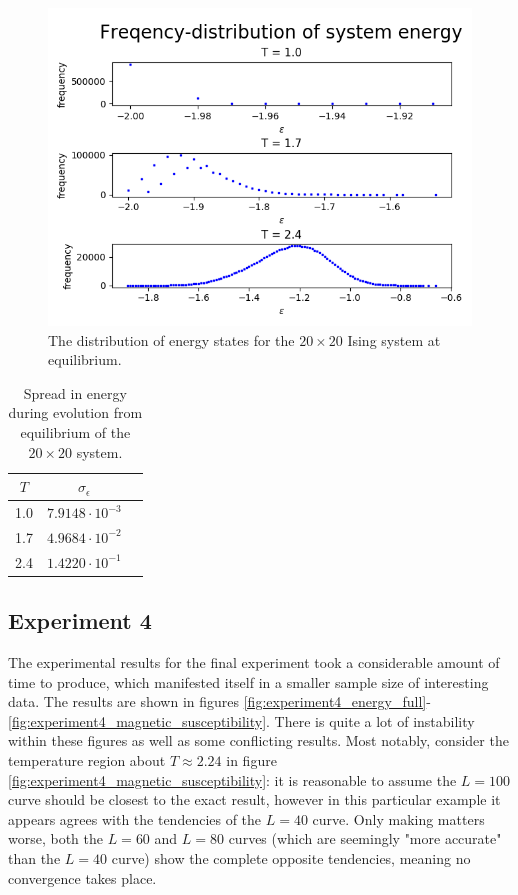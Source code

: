 \documentclass[nofootinbib,reprint,english]{revtex4-1}
\begin{document}
\begin{figure}
\centering
\includegraphics[scale=0.5]{../output/figures/experiment3/energy_distribution.png}
\caption{The distribution of energy states for the \(20\times20\) Ising system at equilibrium.}\label{fig:experiment3_energy_distribution}
\end{figure}

\begin{table}
\centering
\begin{tabular}{|c|c|c|}
\hline\rule{0pt}{0.32cm}
\(T\) & \(\sigma_\epsilon\)    \\\hline\rule{0pt}{0.32cm}
1.0   & \(7.9148\cdot10^{-3}\) \\\hline\rule{0pt}{0.32cm}
1.7   & \(4.9684\cdot10^{-2}\) \\\hline\rule{0pt}{0.32cm}
2.4   & \(1.4220\cdot10^{-1}\) \\\hline
\end{tabular}
\caption{Spread in energy during evolution from equilibrium of the \(20\times20\) system.}\label{tab:20by20_std_energy_evolution}
\end{table}

\subsection{Experiment 4}
The experimental results for the final experiment took a considerable amount of time to produce, which manifested itself in a smaller sample size of interesting data. The results are shown in figures \ref{fig:experiment4_energy_full}-\ref{fig:experiment4_magnetic_susceptibility}. There is quite a lot of instability within these figures as well as some conflicting results. Most notably, consider the temperature region about \(T\approx2.24\) in figure \ref{fig:experiment4_magnetic_susceptibility}: it is reasonable to assume the \(L=100\) curve should be closest to the exact result, however in this particular example it appears agrees with the tendencies of the \(L=40\) curve. Only making matters worse, both the \(L=60\) and \(L=80\) curves (which are seemingly "more accurate" than the \(L=40\) curve) show the complete opposite tendencies, meaning no convergence takes place.
\end{document}

